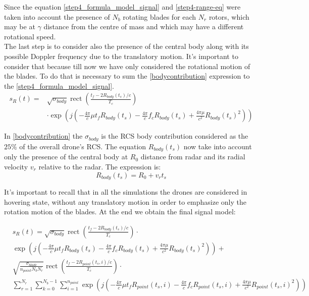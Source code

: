 Since the equation \ref{step4_formula_model_signal} and \ref{step4-range-eq} were taken into account the presence of $N_{b}$ rotating blades for each $N_{r}$ rotors, which may be at $\gamma$ distance from the centre of mass and which may have a different rotational speed.\\
The last step is to consider also the presence of the central body along with its possible Doppler frequency due to the translatory motion. It's important to consider that because till now we have only considered the rotational motion of the blades. To do that is necessary to sum the \ref{bodycontribution} expression to the \ref{step4_formula_model_signal}.
\begin{equation}
\begin{aligned}
s_{R}(t)=& \sqrt{\sigma_{body}}\operatorname{rect}\left(\frac{t_{f}-2 R_{body}\left(t_{s}\right) / c}{T_{c}}\right) \\
& \cdot \exp \left(j\left(-\frac{4 \pi}{c} \mu t_{f} R_{body}\left(t_{s}\right)-\frac{4 \pi}{c} f_{c} R_{body}\left(t_{s}\right)+\frac{4 \pi \mu}{c^{2}} R_{body}\left(t_{s}\right)^{2}\right)\right)
\end{aligned}
\label{bodycontribution}
\end{equation}

In \ref{bodycontribution} the $\sigma_{body}$ is the RCS body contribution considered as the $25\%$ of the overall drone's RCS. The equation $R_{body}(t_{s})$ now take into account only the presence of the central body at $R_{0}$ distance from radar and its radial velocity $v_{r}$ relative to the radar. The expression is:
\begin{equation}
R_{body}(t_s)=R_{0}+v_{r}t_{s}
\label{range_equation_of body}
\end{equation}

It's important to recall that in all the simulations the drones are considered in hovering state, without any translatory motion in order to emphasize only the rotation motion of the blades.
At the end we obtain the final signal model:

\begin{equation}
\begin{aligned}
&s_{R}(t)=\sqrt{\sigma_{body}}\operatorname{rect}\left(\frac{t_{f}-2 R_{body}\left(t_{s}\right) / c}{T_{c}}\right) \cdot \\
& \exp \left(j\left(-\frac{4 \pi}{c} \mu t_{f} R_{body}\left(t_{s}\right)-\frac{4 \pi}{c} f_{c} R_{body}\left(t_{s}\right)+\frac{4 \pi \mu}{c^{2}} R_{body}\left(t_{s}\right)^{2}\right)\right)+\\
&\sqrt{\frac{\sigma_{blade}}{n_{point} N_b N_r}}\operatorname{rect}\left(\frac{t_{f}-2 R_{point}\left(t_{s},i\right) / c}{T_{c}}\right) \cdot\\
& \sum_{r=1}^{N_{r}} \sum_{k=0}^{N_{b}-1} \sum_{i=1}^{n_{point}} \exp \left(j\left(-\frac{4 \pi}{c} \mu t_{f} R_{point}\left(t_{s},i\right)-\frac{4 \pi}{c} f_{c} R_{point}\left(t_{s},i\right)+\frac{4 \pi \mu}{c^{2}} R_{point}\left(t_{s},i\right)^{2}\right)\right)
\end{aligned}
\end{equation}

